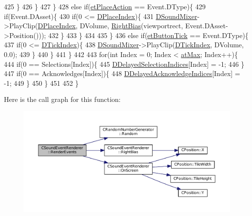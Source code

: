 \begin{DoxyCode}
425                 \}
426             \}
427         \}
428         \textcolor{keywordflow}{else} \textcolor{keywordflow}{if}(\hyperlink{GameModel_8h_abfcf510bafec7c6429906a6ecaac656da6b069d43a732ecd2eec5fbcebf3e41ee}{etPlaceAction} == Event.DType)\{
429             \textcolor{keywordflow}{if}(Event.DAsset)\{
430                 \textcolor{keywordflow}{if}(0 <= \hyperlink{classCSoundEventRenderer_a0ca919430ff2fb57324c0ee712c5b7b1}{DPlaceIndex})\{
431                     \hyperlink{classCSoundEventRenderer_a5abf598a7e8783d9cc78e0d33a65c9c2}{DSoundMixer}->PlayClip(\hyperlink{classCSoundEventRenderer_a0ca919430ff2fb57324c0ee712c5b7b1}{DPlaceIndex}, DVolume, 
      \hyperlink{classCSoundEventRenderer_a4be5ff09785c55c3b5b6966fb41eb47f}{RightBias}(viewportrect, Event.DAsset->Position()));
432                 \}
433             \}
434                
435         \}
436         \textcolor{keywordflow}{else} \textcolor{keywordflow}{if}(\hyperlink{GameModel_8h_abfcf510bafec7c6429906a6ecaac656dafe7284f9af34794514e5dbfe974e3296}{etButtonTick} == Event.DType)\{
437             \textcolor{keywordflow}{if}(0 <= \hyperlink{classCSoundEventRenderer_a810ef7feb31ba13f89919ed78d0cee25}{DTickIndex})\{
438                 \hyperlink{classCSoundEventRenderer_a5abf598a7e8783d9cc78e0d33a65c9c2}{DSoundMixer}->PlayClip(\hyperlink{classCSoundEventRenderer_a810ef7feb31ba13f89919ed78d0cee25}{DTickIndex}, DVolume, 0.0);
439             \}
440         \}
441     \}
442     
443     \textcolor{keywordflow}{for}(\textcolor{keywordtype}{int} Index = 0; Index < \hyperlink{GameDataTypes_8h_a5600d4fc433b83300308921974477feca92fbf60b4e5c335160f915b6a1c17c05}{atMax}; Index++)\{
444         \textcolor{keywordflow}{if}(0 == Selections[Index])\{
445             \hyperlink{classCSoundEventRenderer_ab2103a634f4ba6d12824ecddf6693870}{DDelayedSelectionIndices}[Index] = -1;
446         \}
447         \textcolor{keywordflow}{if}(0 == Acknowledges[Index])\{
448             \hyperlink{classCSoundEventRenderer_a8e36efd07e98242ea3a80564c595e397}{DDelayedAcknowledgeIndices}[Index] = -1;
449         \}
450     \}
451 
452 \}
\end{DoxyCode}
Here is the call graph for this function\+:
\nopagebreak
\begin{figure}[H]
\begin{center}
\leavevmode
\includegraphics[width=350pt]{classCSoundEventRenderer_aa8b0c3029ea920ae4f4a08b9d9dd1c9c_cgraph}
\end{center}
\end{figure}
